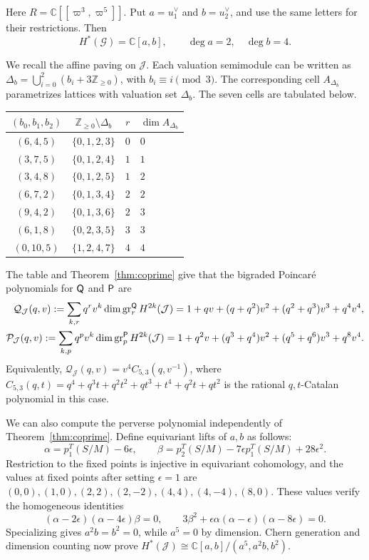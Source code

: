 \documentclass[a4paper,11pt,leqno]{amsart}
\newcommand{\C}{\mathbb C}\newcommand{\J}{\mathcal J}
\newcommand{\eps}{\epsilon}\newcommand{\dd}{\delta}
\begin{document}
\begin{ex}
Here $R=\C[[\varpi^3,\varpi^5]]$. 
Put $a=u_1^\vee$ and $b=u_2^\vee$, and use
the same letters for their restrictions. Then
\[
 H^*(\mathcal G)=\C[a,b],
 \qquad \deg a=2,\quad\deg b=4.
\]
%

We recall the affine paving on $\J$. Each valuation semimodule can be written as
$\Delta_b=\bigcup_{i=0}^2(b_i+3\mathbb Z_{\ge0})$, with
$b_i\equiv i\pmod3$. 
The corresponding cell
$A_{\Delta_b}$ parametrizes lattices with valuation set $\Delta_b$. The seven cells are tabulated below.
\begin{center}\small
\begin{tabular}{@{}c c c l@{}}\toprule
$(b_0,b_1,b_2)$ & $\mathbb Z_{\ge0}\setminus\Delta_b$ & $r$ & $\dim A_{\Delta_b}$ \\\midrule
$(6,4,5)$ & $\{0,1,2,3\}$ & $0$ & $0$  \\
$(3,7,5)$ & $\{0,1,2,4\}$ & $1$ & $1$  \\
$(3,4,8)$ & $\{0,1,2,5\}$ & $1$ & $2$  \\
$(6,7,2)$ & $\{0,1,3,4\}$ & $2$ & $2$  \\
$(9,4,2)$ & $\{0,1,3,6\}$ & $2$ & $3$  \\
$(6,1,8)$ & $\{0,2,3,5\}$ & $3$ & $3$  \\
$(0,10,5)$ & $\{1,2,4,7\}$ & $4$ & $4$ \\\bottomrule
\end{tabular}
\end{center}
The table and Theorem~\ref{thm:coprime} give that the bigraded Poincar\'e
polynomials for $\sf Q$ and $\sf P$ are
\begin{align}
 \mathcal Q_\J(q,v):=\sum_{k,r}q^rv^k\dim\gr^{\sf Q}_rH^{2k}(\J)=1+qv+(q+q^2)v^2+(q^2+q^3)v^3+q^4v^4,\\
 \mathcal P_\J(q,v):=\sum_{k,p}q^pv^k\dim\gr^{\sf P}_pH^{2k}(\J)=1+q^2v+(q^3+q^4)v^2+(q^5+q^6)v^3+q^8v^4.
\end{align}
Equivalently, $\mathcal Q_\J(q,v)=v^4C_{5,3}(q,v^{-1})$, where
$C_{5,3}(q,t)=q^4+q^3t+q^2t^2+qt^3+t^4+q^2t+qt^2$ is the
rational $q,t$-Catalan polynomial in this case. 

We can also compute the perverse polynomial independently of
Theorem~\ref{thm:coprime}. 
Define equivariant lifts of $a, b$ as follows:
\[
 \alpha=p_1^T(S/M)-6\eps,\qquad
 \beta=p_2^T(S/M)-7\eps p_1^T(S/M)+28\eps^2.
\]
Restriction to the fixed points is injective in equivariant cohomology,
and the values at fixed points after setting $\eps=1$ are
$(0,0),(1,0),(2,2),(2,-2),(4,4),(4,-4),(8,0)$.
These values verify the
 homogeneous identities
\begin{equation}
\label{eq:equivrels}
 (\alpha-2\eps)(\alpha-4\eps)\beta=0,\qquad
 3\beta^2+\eps\alpha(\alpha-\eps)(\alpha-8\eps)=0.
\end{equation}
Specializing gives $a^2b=b^2=0$, while $a^5=0$ by dimension.
Chern generation and dimension counting now prove
$
 H^*(\J)\cong \C[a,b]/(a^5,a^2b,b^2).
$



\end{ex}
\end{document}
